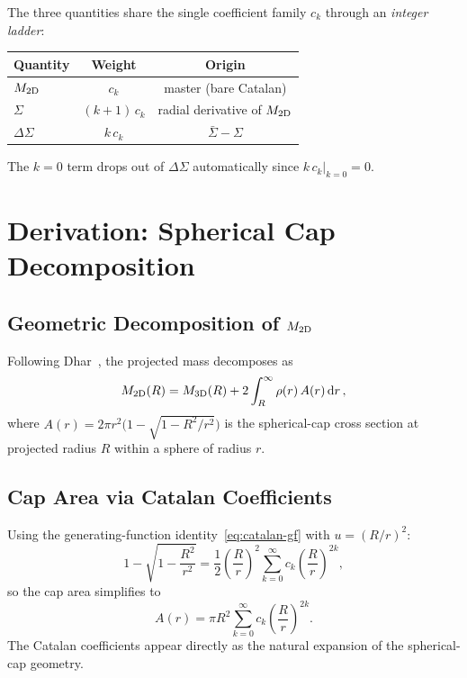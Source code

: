 \documentclass{article}
\begin{document}
\noindent
The three quantities share the single coefficient family $c_k$ through an
\emph{integer ladder}:
\begin{center}
\begin{tabular}{lcc}
\toprule
Quantity & Weight & Origin \\
\midrule
$M_{\rm 2D}$ & $c_k$ & master (bare Catalan) \\
$\Sigma$ & $(k+1)\,c_k$ & radial derivative of $M_{\rm 2D}$ \\
$\Delta\Sigma$ & $k\,c_k$ & $\bar\Sigma - \Sigma$ \\
\bottomrule
\end{tabular}
\end{center}
The $k=0$ term drops out of $\Delta\Sigma$ automatically since
$k\,c_k\big|_{k=0}=0$.

\section{Derivation: Spherical Cap Decomposition}
\label{sec:derivation}

\subsection{Geometric Decomposition of $M_{\rm 2D}$}

Following Dhar~\cite{Dhar2021}, the projected mass decomposes as
\begin{equation}\label{eq:cap-split}
M_{\rm 2D}(R) = M_{\rm 3D}(R) + 2\int_R^{\infty}\rho(r)\,A(r)\,\mathrm{d}r\,,
\end{equation}
where
$A(r) = 2\pi r^2\bigl(1-\sqrt{1-R^2/r^2}\bigr)$
is the spherical-cap cross section at projected radius $R$ within a sphere of
radius $r$.

\subsection{Cap Area via Catalan Coefficients}

Using the generating-function identity~\eqref{eq:catalan-gf} with
$u=(R/r)^2$:
\begin{equation}
1-\sqrt{1-\frac{R^2}{r^2}}
= \frac{1}{2}\left(\frac{R}{r}\right)^{\!2}\sum_{k=0}^{\infty}c_k\left(\frac{R}{r}\right)^{\!2k},
\end{equation}
so the cap area simplifies to
\begin{equation}\label{eq:cap-area}
A(r) = \pi R^2 \sum_{k=0}^{\infty} c_k\left(\frac{R}{r}\right)^{\!2k}.
\end{equation}
The Catalan coefficients appear directly as the natural expansion of the
spherical-cap geometry.
\end{document}
